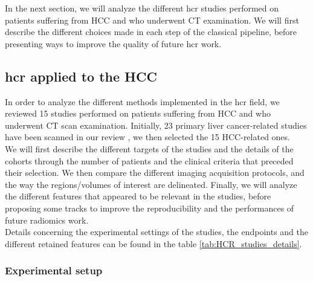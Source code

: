 In the next section, we will analyze the different \ac{hcr} studies
performed on patients suffering from HCC and who underwent CT
examination. We will first describe the different choices made in each
step of the classical pipeline, before presenting ways to improve the
quality of future \ac{hcr} work.

\subsection{\ac{hcr} applied to the HCC}\label{hcr-applied-to-the-liver}

In order to analyze the different methods implemented in the \ac{hcr}
field, we reviewed 15 studies performed on patients suffering from HCC and who
underwent CT scan examination. Initially, 23 primary liver
cancer-related studies have been scanned in our review \cite{Wakabayashi2019}, 
we then selected the 15 HCC-related ones.\\
We will first describe the different targets of the studies and the
details of the cohorts through the number of patients and the clinical
criteria that preceded their selection.
We then compare the different imaging acquisition protocols, and
the way the regions/volumes of interest are delineated. Finally, we will
analyze the different features that appeared to be relevant in the
studies, before proposing some tracks to improve the reproducibility and
the performances of future radiomics work.\\
Details concerning the experimental settings of the studies, the
endpoints and the different retained features can be found 
in the table \ref{tab:HCR_studies_details}.



\subsubsection{Experimental setup}\label{experimental-setup}

